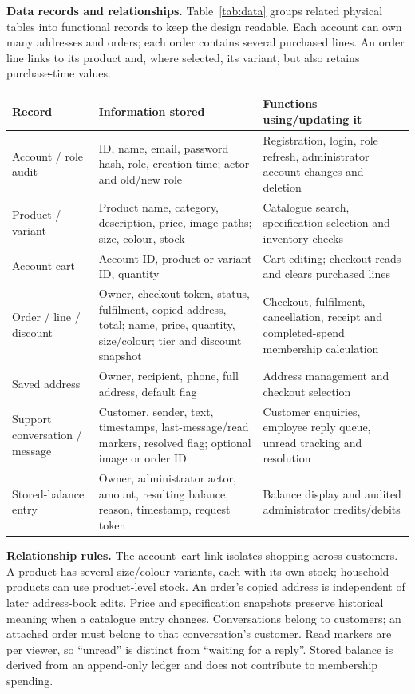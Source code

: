 \documentclass[11pt,a4paper]{article}
\begin{document}
\newpage
\textbf{Data records and relationships.} Table~\ref{tab:data} groups related physical tables into functional records to keep the design readable. Each account can own many addresses and orders; each order contains several purchased lines. An order line links to its product and, where selected, its variant, but also retains purchase-time values.
\begin{center}
\small
\begin{tabularx}{\linewidth}{|p{27mm}|Y|Y|}\hline
\textbf{Record}&\textbf{Information stored}&\textbf{Functions using/updating it}\\\hline
Account / role audit&ID, name, email, password hash, role, creation time; actor and old/new role&Registration, login, role refresh, administrator account changes and deletion\\\hline
Product / variant&Product name, category, description, price, image paths; size, colour, stock&Catalogue search, specification selection and inventory checks\\\hline
Account cart&Account ID, product or variant ID, quantity&Cart editing; checkout reads and clears purchased lines\\\hline
Order / line / discount&Owner, checkout token, status, fulfilment, copied address, total; name, price, quantity, size/colour; tier and discount snapshot&Checkout, fulfilment, cancellation, receipt and completed-spend membership calculation\\\hline
Saved address&Owner, recipient, phone, full address, default flag&Address management and checkout selection\\\hline
Support conversation / message&Customer, sender, text, timestamps, last-message/read markers, resolved flag; optional image or order ID&Customer enquiries, employee reply queue, unread tracking and resolution\\\hline
Stored-balance entry&Owner, administrator actor, amount, resulting balance, reason, timestamp, request token&Balance display and audited administrator credits/debits\\\hline
\end{tabularx}
\label{tab:data}
\end{center}

\textbf{Relationship rules.} The account--cart link isolates shopping across customers. A product has several size/colour variants, each with its own stock; household products can use product-level stock. An order's copied address is independent of later address-book edits. Price and specification snapshots preserve historical meaning when a catalogue entry changes. Conversations belong to customers; an attached order must belong to that conversation's customer. Read markers are per viewer, so ``unread'' is distinct from ``waiting for a reply''. Stored balance is derived from an append-only ledger and does not contribute to membership spending.
\end{document}
